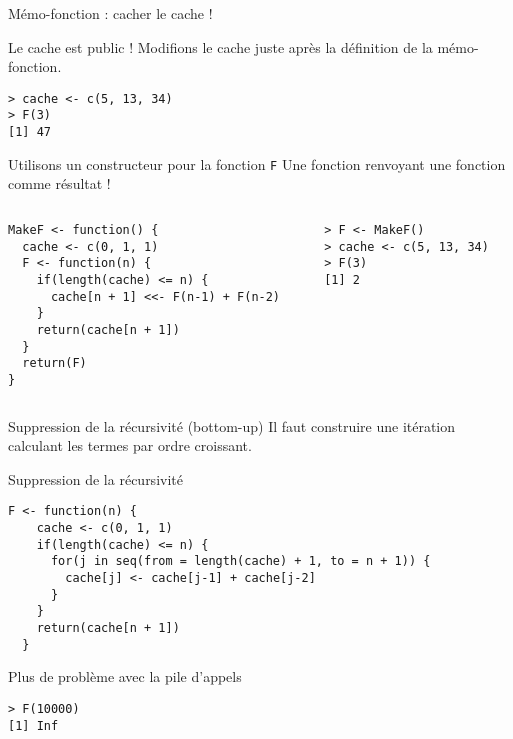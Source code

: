 \documentclass[10pt]{beamer}
\begin{document}
\begin{frame}[fragile]{Mémo-fonction : cacher le cache !}
  \begin{block}{Le cache est public !}
    Modifions le cache juste après la définition de la mémo-fonction.
\begin{lstlisting}
> cache <- c(5, 13, 34)
> F(3)
[1] 47
\end{lstlisting}
\end{block}
\begin{block}{Utilisons un constructeur pour la fonction \texttt{F}}
  Une fonction renvoyant une fonction comme résultat !

\begin{columns}[t]
\begin{column}{0.55\textwidth}
\begin{lstlisting}[style=editor]
MakeF <- function() {
  cache <- c(0, 1, 1)
  F <- function(n) {
    if(length(cache) <= n) {
      cache[n + 1] <<- F(n-1) + F(n-2)
    }
    return(cache[n + 1]) 
  }
  return(F)
}
  \end{lstlisting}
\end{column}
\begin{column}{0.45\textwidth}
  \begin{lstlisting}
> F <- MakeF()
> cache <- c(5, 13, 34)
> F(3)
[1] 2    
  \end{lstlisting}
\end{column}
\end{columns}
\end{block}
\end{frame}


\begin{frame}[fragile]{Suppression de la récursivité (bottom-up)}
  Il faut construire une itération calculant les termes par ordre croissant.
  \begin{alertblock}{Suppression de la récursivité}
    \begin{lstlisting}[style=edblock]
F <- function(n) {
    cache <- c(0, 1, 1)
    if(length(cache) <= n) {
      for(j in seq(from = length(cache) + 1, to = n + 1)) {
        cache[j] <- cache[j-1] + cache[j-2]
      }
    }
    return(cache[n + 1]) 
  }   
    \end{lstlisting}
  \end{alertblock}


  \begin{exampleblock}{Plus de problème avec la pile d'appels}
    \begin{lstlisting}[style=block]
> F(10000)
[1] Inf    
    \end{lstlisting}
  \end{exampleblock}

\end{frame}
\end{document}
